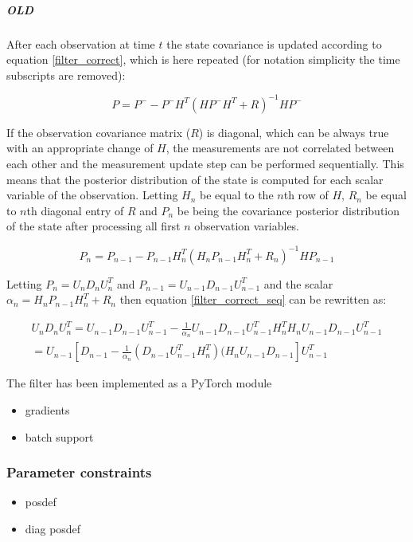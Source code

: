 \documentclass{article}
\begin{document}
\subparagraph{OLD}

After each observation at time $t$ the state covariance is updated according to equation \ref{filter_correct}, which is here repeated (for notation simplicity the time subscripts are removed):

$$ P = P^- - P^-H^T(HP^-H^T + R)^{-1}HP^-$$

If the observation covariance matrix ($R$) is diagonal, which can be always true with an appropriate change of $H$, the measurements are not correlated between each other and the measurement update step can be performed sequentially. This means that the posterior distribution of the state is computed for each scalar variable of the observation. Letting $H_n$ be equal to the $n$th row of $H$, $R_n$ be equal to $n$th diagonal entry of $R$ and $P_n$ be being the covariance posterior distribution of the state after processing all first $n$ observation variables.


\begin{equation}\label{filter_correct_seq}
P_n = P_{n-1} - P_{n-1}H_n^T(H_nP_{n-1}H_n^T + R_n)^{-1}HP_{n-1}
\end{equation}

Letting $P_n = U_nD_nU_n^T$ and $P_{n-1} = U_{n-1}D_{n-1}U_{n-1}^T$ and the scalar $ \alpha_n = H_nP_{n-1}H_{n}^T + R_n$ then equation \ref{filter_correct_seq} can be rewritten as:

\begin{multline}
U_nD_nU_n^T = U_{n-1}D_{n-1}U_{n-1}^T - \frac{1}{\alpha_n}U_{n-1}D_{n-1}U_{n-1}^TH_n^TH_nU_{n-1}D_{n-1}U_{n-1}^T \\
= U_{n-1} \left[ D_{n-1} - \frac{1}{\alpha_n}(D_{n-1}U_{n-1}^TH_n^T)(H_nU_{n-1}D_{n-1}\right]U_{n-1}^T
\end{multline}





The filter has been implemented as a PyTorch module

\begin{itemize}
    \item gradients
    \item batch support
\end{itemize}


\subsubsection{Parameter constraints}

\begin{itemize}
    \item posdef
    \item diag posdef 
\end{itemize}
\end{document}
